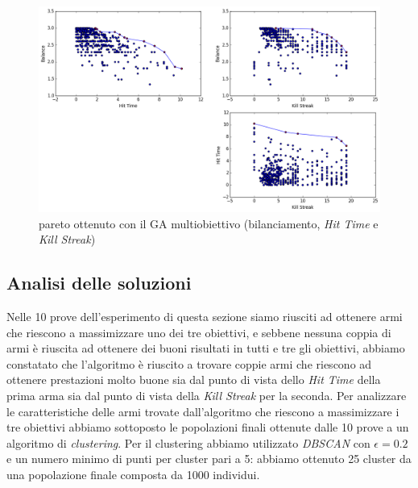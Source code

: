 \documentclass[12pt, italian]{toptesi}
\begin{document}
\begin{figure}[tp]
\centering
\includegraphics[width=1.0\textwidth]{pareto_delta_kill}
\caption{pareto ottenuto con il GA multiobiettivo (bilanciamento, \emph{Hit Time} e \emph{Kill Streak})}
\label{fig:pareto_delta_kill}
\end{figure}

\subsection{Analisi delle soluzioni}
\label{sec:delta_kill_sol}
Nelle 10 prove dell'esperimento di questa sezione siamo riusciti ad ottenere armi che riescono a massimizzare uno dei tre obiettivi, e sebbene nessuna coppia di armi è riuscita ad ottenere dei buoni risultati in tutti e tre gli obiettivi, abbiamo constatato che l'algoritmo è riuscito a trovare coppie armi che riescono ad ottenere prestazioni molto buone sia dal punto di vista dello \emph{Hit Time} della prima arma sia dal punto di vista della \emph{Kill Streak} per la seconda.
Per analizzare le caratteristiche delle armi trovate dall'algoritmo che riescono a massimizzare i tre obiettivi abbiamo sottoposto le popolazioni finali ottenute dalle 10 prove a un algoritmo di \emph{clustering}.
Per il clustering abbiamo utilizzato \emph{DBSCAN} con $\epsilon = 0.2$ e un numero minimo di punti per cluster pari a 5: abbiamo ottenuto 25 cluster da una popolazione finale composta da 1000 individui.
\end{document}
